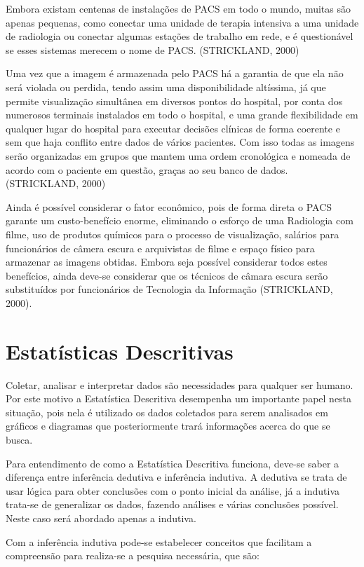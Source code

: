 \documentclass[
	12pt,				%
	openright,			%
	twoside,			%
	a4paper,			%
	english,			%
	french,				%
	spanish,			%
	brazil				%
	]{abntex2}
\begin{document}
Embora existam centenas de instalações de PACS em todo o mundo, muitas são apenas pequenas, como conectar uma unidade de terapia intensiva a uma unidade de radiologia ou conectar algumas estações de trabalho em rede, e é questionável se esses sistemas merecem o nome de PACS. (STRICKLAND, 2000)

Uma vez que a imagem é armazenada pelo PACS há a garantia de que ela não será violada ou perdida, tendo assim uma disponibilidade altíssima, já que permite visualização simultânea em diversos pontos do hospital, por conta dos numerosos terminais instalados em todo o hospital, e uma grande flexibilidade em qualquer lugar do hospital para executar decisões clínicas de forma coerente e sem que haja conflito entre dados de vários pacientes. Com isso todas as imagens serão organizadas em grupos que mantem uma ordem cronológica e nomeada de acordo com o paciente em questão, graças ao seu banco de dados. (STRICKLAND, 2000)

Ainda é possível considerar o fator econômico, pois de forma direta o PACS garante um custo-benefício enorme, eliminando o esforço de uma Radiologia com filme, uso de produtos químicos para o processo de visualização, salários para funcionários de câmera escura e arquivistas de filme e espaço físico para armazenar as imagens obtidas. Embora seja possível considerar todos estes benefícios, ainda deve-se considerar que os técnicos de câmara escura serão substituídos por funcionários de Tecnologia da Informação (STRICKLAND, 2000).

\section{Estatísticas Descritivas}

Coletar, analisar e interpretar dados são necessidades para qualquer ser humano. Por este motivo a Estatística Descritiva desempenha um importante papel nesta situação, pois nela é utilizado os dados coletados para serem analisados em gráficos e diagramas que posteriormente trará informações acerca do que se busca.

Para entendimento de como a Estatística Descritiva funciona, deve-se saber a diferença entre inferência dedutiva e inferência indutiva. A dedutiva se trata de usar lógica para obter conclusões com o ponto inicial da análise, já a indutiva trata-se de generalizar os dados, fazendo análises e várias conclusões possível. Neste caso será abordado apenas a indutiva.

Com a inferência indutiva pode-se estabelecer conceitos que facilitam a compreensão para realiza-se a pesquisa necessária, que são: 
\end{document}
